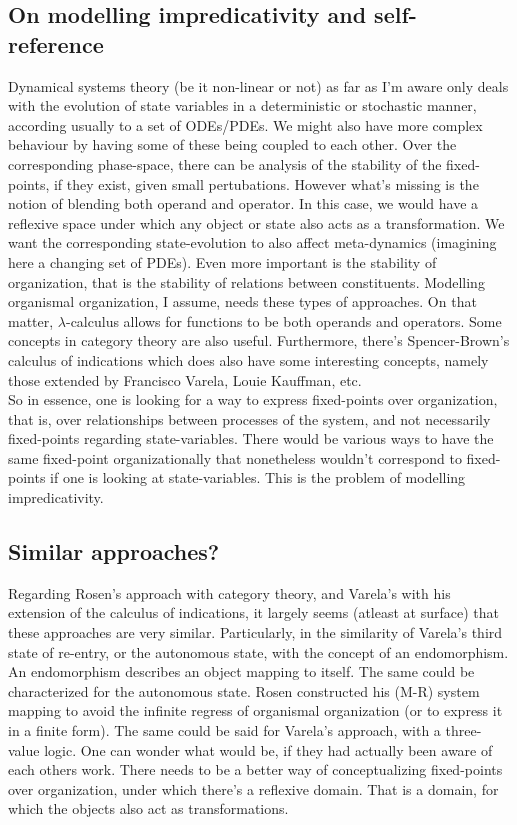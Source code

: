\documentclass[a4paper,12pt,twoside,leqno]{article}
\begin{document}
\subsection*{On modelling impredicativity and self-reference}
Dynamical systems theory (be it non-linear or not) as far as I'm aware only deals with the evolution of state variables in a deterministic or stochastic manner, according usually to a set of ODEs/PDEs. We might also have more complex behaviour by having some of these being coupled to each other. Over the corresponding phase-space, there can be analysis of the stability of the fixed-points, if they exist, given small pertubations. However what's missing is the notion of blending both operand and operator. In this case, we would have a reflexive space under which any object or state also acts as a transformation. We want the corresponding state-evolution to also affect meta-dynamics (imagining here a changing set of PDEs). Even more important is the stability of organization, that is the stability of relations between constituents. Modelling organismal organization, I assume, needs these types of approaches. On that matter, $\lambda$-calculus allows for functions to be both operands and operators. Some concepts in category theory are also useful. Furthermore, there's Spencer-Brown's calculus of indications which does also have some interesting concepts, namely those extended by Francisco Varela, Louie Kauffman, etc.\\
So in essence, one is looking for a way to express fixed-points over organization, that is, over relationships between processes of the system, and not necessarily fixed-points regarding state-variables. There would be various ways to have the same fixed-point organizationally that nonetheless wouldn't correspond to fixed-points if one is looking at state-variables. This is the problem of modelling impredicativity.
\subsection*{Similar approaches?}
Regarding Rosen's approach with category theory, and Varela's with his extension of the calculus of indications, it largely seems (atleast at surface) that these approaches are very similar. Particularly, in the similarity of Varela's third state of re-entry, or the autonomous state, with the concept of an endomorphism. An endomorphism describes an object mapping to itself. The same could be characterized for the autonomous state. Rosen constructed his (M-R) system mapping to avoid the infinite regress of organismal organization (or to express it in a finite form). The same could be said for Varela's approach, with a three-value logic. One can wonder what would be, if they had actually been aware of each others work. There needs to be a better way of conceptualizing fixed-points over organization, under which there's a reflexive domain. That is a domain, for which the objects also act as transformations. 
\end{document}
